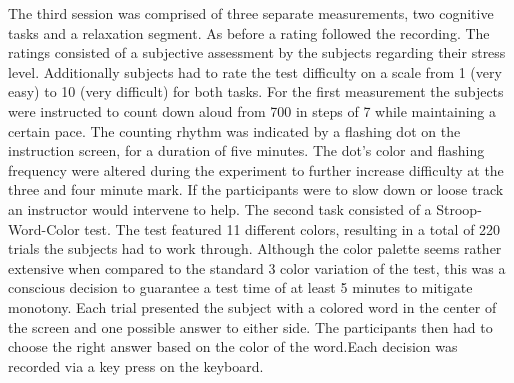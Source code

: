 The third session was comprised of three separate measurements, two cognitive tasks and a relaxation segment. As before a rating followed the recording. The ratings consisted of a subjective assessment by the subjects regarding their stress level. Additionally subjects had to rate the test difficulty on a scale from 1 (very easy) to 10 (very difficult) for both tasks. 
For the first measurement the subjects were instructed to count down aloud from 700 in steps of 7 while maintaining a certain pace. The counting rhythm was indicated by a flashing dot on the instruction screen, for a duration of five minutes. The dot's color and flashing frequency were altered during the experiment to further increase difficulty at the three and four minute mark. If the participants were to slow down or loose track an instructor would intervene to help.
The second task consisted of a Stroop-Word-Color test. The test featured 11 different colors, resulting in a total of 220 trials the subjects had to work through. Although the color palette seems rather extensive when compared to the standard 3 color variation of the test, this was a conscious decision to guarantee a test time of at least 5 minutes to mitigate monotony. Each trial presented the subject with a colored word in the center of the screen and one possible answer to either side. The participants then had to choose the right answer based on the color of the word.Each decision was recorded via a key press on the keyboard. 


